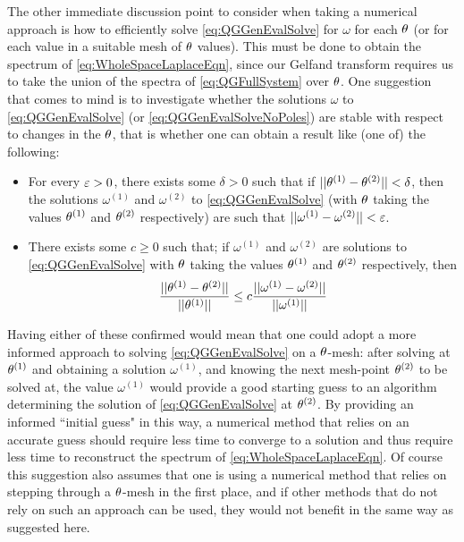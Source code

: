 The other immediate discussion point to consider when taking a numerical approach is how to efficiently solve \eqref{eq:QGGenEvalSolve} for $\omega$ for each $\theta$ (or for each value in a suitable mesh of $\theta$ values).
This must be done to obtain the spectrum of \eqref{eq:WholeSpaceLaplaceEqn}, since our Gelfand transform requires us to take the union of the spectra of \eqref{eq:QGFullSystem} over $\theta$.
One suggestion that comes to mind is to investigate whether the solutions $\omega$ to \eqref{eq:QGGenEvalSolve} (or \eqref{eq:QGGenEvalSolveNoPoles}) are stable with respect to changes in the $\theta$, that is whether one can obtain a result like (one of) the following:
\begin{itemize}
	\item For every $\varepsilon>0$, there exists some $\delta>0$ such that if $\lvert\lvert \theta^{(1)}-\theta^{(2)} \rvert\rvert<\delta$, then the solutions $\omega^{(1)}$ and $\omega^{(2)}$ to \eqref{eq:QGGenEvalSolve} (with $\theta$ taking the values $\theta^{(1)}$ and $\theta^{(2)}$ respectively) are such that $\lvert\lvert \omega^{(1)}-\omega^{(2)} \rvert\rvert<\varepsilon$.
	\item There exists some $c\geq 0$ such that; if $\omega^{(1)}$ and $\omega^{(2)}$ are solutions to \eqref{eq:QGGenEvalSolve} with $\theta$ taking the values $\theta^{(1)}$ and $\theta^{(2)}$ respectively, then
	\begin{align*}
		\frac{ \lvert\lvert \theta^{(1)}-\theta^{(2)} \rvert\rvert }{ \lvert\lvert \theta^{(1)} \rvert\rvert } \leq c \frac{ \lvert\lvert \omega^{(1)}-\omega^{(2)} \rvert\rvert }{ \lvert\lvert \omega^{(1)} \rvert\rvert }
	\end{align*}
\end{itemize}
Having either of these confirmed would mean that one could adopt a more informed approach to solving \eqref{eq:QGGenEvalSolve} on a $\theta$-mesh: after solving at $\theta^{(1)}$ and obtaining a solution $\omega^{(1)}$, and knowing the next mesh-point $\theta^{(2)}$ to be solved at, the value $\omega^{(1)}$ would provide a good starting guess to an algorithm determining the solution of \eqref{eq:QGGenEvalSolve} at $\theta^{(2)}$.
By providing an informed ``initial guess" in this way, a numerical method that relies on an accurate guess should require less time to converge to a solution and thus require less time to reconstruct the spectrum of \eqref{eq:WholeSpaceLaplaceEqn}.
Of course this suggestion also assumes that one is using a numerical method that relies on stepping through a $\theta$-mesh in the first place, and if other methods that do not rely on such an approach can be used, they would not benefit in the same way as suggested here.
